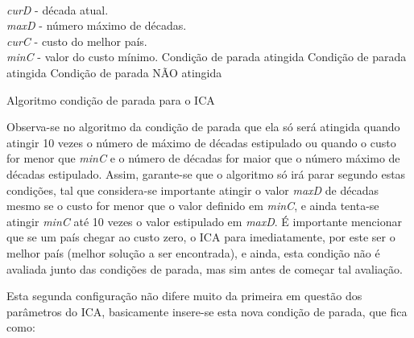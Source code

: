  \begin{algorithm}[h]
\SetAlgoLined
\KwData
{
\\ \emph{curD} - década atual.
\\ \emph{maxD} - número máximo de décadas.
\\ \emph{curC} - custo do melhor país.
\\ \emph{minC} - valor do custo mínimo.
}
    {
    	\KwRetorna Condição de parada atingida\;
    }
    {
     	{
        	\KwRetorna Condição de parada atingida\;
        }
    }
   \KwRetorna Condição de parada NÃO atingida\;

 \caption{Algoritmo condição de parada para o ICA}
\label{alg:FpCP}
\end{algorithm}

Observa-se no algoritmo da condição de parada que ela só será atingida quando atingir 10 vezes o número de máximo de décadas estipulado ou quando o custo for menor que \emph{minC} e o número de décadas for maior que o número máximo de décadas estipulado. Assim, garante-se que o algoritmo só irá parar segundo estas condições, tal que considera-se importante atingir o valor \emph{maxD} de décadas mesmo se o custo for menor que o valor definido em  \emph{minC}, e ainda tenta-se atingir \emph{minC} até 10 vezes o valor estipulado em \emph{maxD}. É importante mencionar que se um país chegar ao custo zero, o ICA para imediatamente, por este ser o melhor país (melhor solução a ser encontrada), e ainda, esta condição não é avaliada junto das condições de parada, mas sim antes de começar tal avaliação.

Esta segunda configuração não difere muito da primeira em questão dos parâmetros do ICA, basicamente insere-se esta nova condição de parada, que fica como:

